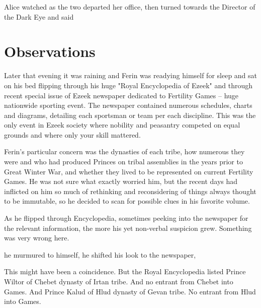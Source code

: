 Alice watched as the two departed her office, then turned towards the Director of the Dark Eye and said




\section{Observations}

Later that evening it was raining and Ferin was readying himself for sleep and sat on his bed flipping through his huge "Royal Encyclopedia of Ezeek" and through recent special issue of Ezeek newspaper dedicated to Fertility Games -- huge nationwide sporting event. The newspaper contained numerous schedules, charts and diagrams, detailing each sportsman or team per each discipline. This was the only event in Ezeek society where nobility and peasantry competed on equal grounds and where only your skill mattered.

Ferin's particular concern was the dynasties of each tribe, how numerous they were and who had produced Princes on tribal assemblies in the years prior to Great Winter War, and whether they lived to be represented on current Fertility Games. He was not sure what exactly worried him, but the recent days had inflicted on him so much of rethinking and reconsidering of things always thought to be immutable, so he decided to scan for possible clues in his favorite volume.

As he flipped through Encyclopedia, sometimes peeking into the newspaper for the relevant information, the more his yet non-verbal suspicion grew. Something was very wrong here.

 he murmured to himself,  he shifted his look to the newspaper, 

This might have been a coincidence. But the Royal Encyclopedia listed Prince Wiltor of Chebet dynasty of Irtan tribe. And no entrant from Chebet into Games. And Prince Kalud of Hlud dynasty of Gevan tribe. No entrant from Hlud into Games.

